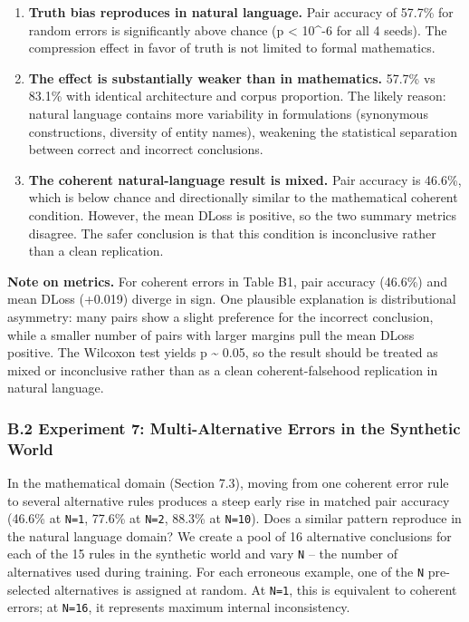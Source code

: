 \documentclass[
  11pt,
]{article}
\begin{document}
\begin{enumerate}
\def\labelenumi{\arabic{enumi}.}
\item
  \textbf{Truth bias reproduces in natural language.} Pair accuracy of
  57.7\% for random errors is significantly above chance (p \textless{}
  10\^{}-6 for all 4 seeds). The compression effect in favor of truth is
  not limited to formal mathematics.
\item
  \textbf{The effect is substantially weaker than in mathematics.}
  57.7\% vs 83.1\% with identical architecture and corpus proportion.
  The likely reason: natural language contains more variability in
  formulations (synonymous constructions, diversity of entity names),
  weakening the statistical separation between correct and incorrect
  conclusions.
\item
  \textbf{The coherent natural-language result is mixed.} Pair accuracy
  is 46.6\%, which is below chance and directionally similar to the
  mathematical coherent condition. However, the mean DLoss is positive,
  so the two summary metrics disagree. The safer conclusion is that this
  condition is inconclusive rather than a clean replication.
\end{enumerate}

\textbf{Note on metrics.} For coherent errors in Table B1, pair accuracy
(46.6\%) and mean DLoss (+0.019) diverge in sign. One plausible
explanation is distributional asymmetry: many pairs show a slight
preference for the incorrect conclusion, while a smaller number of pairs
with larger margins pull the mean DLoss positive. The Wilcoxon test
yields p \textasciitilde{} 0.05, so the result should be treated as
mixed or inconclusive rather than as a clean coherent-falsehood
replication in natural language.

\subsubsection{B.2 Experiment 7: Multi-Alternative Errors in the
Synthetic
World}\label{b.2-experiment-7-multi-alternative-errors-in-the-synthetic-world}

In the mathematical domain (Section 7.3), moving from one coherent error
rule to several alternative rules produces a steep early rise in matched
pair accuracy (46.6\% at \texttt{N=1}, 77.6\% at \texttt{N=2}, 88.3\% at
\texttt{N=10}). Does a similar pattern reproduce in the natural language
domain? We create a pool of 16 alternative conclusions for each of the
15 rules in the synthetic world and vary \texttt{N} -- the number of
alternatives used during training. For each erroneous example, one of
the \texttt{N} pre-selected alternatives is assigned at random. At
\texttt{N=1}, this is equivalent to coherent errors; at \texttt{N=16},
it represents maximum internal inconsistency.
\end{document}

